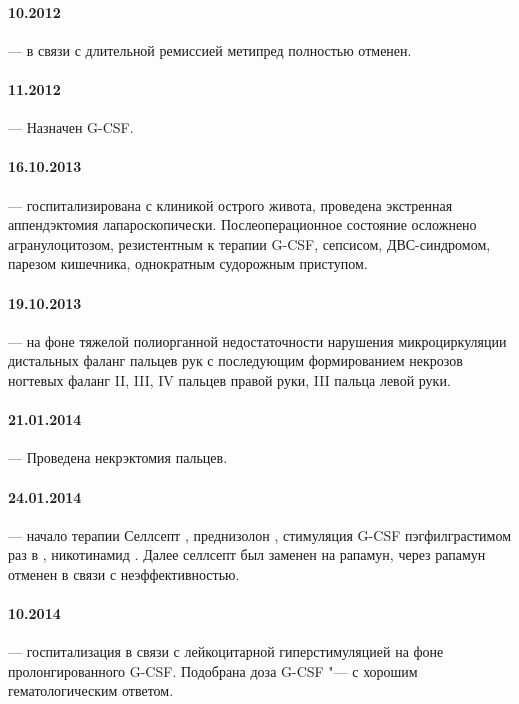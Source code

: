 \documentclass[a4paper,14pt]{extarticle}
\newcommand{\mgpd}{мг/сут.}
\newcommand{\mugpkg}{мкг/кг}
\newcommand{\months}{мес.}
\newcommand{\weeks}{нед.}
\begin{document}
\paragraph{10.2012} --- в связи с длительной ремиссией метипред полностью отменен.

\paragraph{11.2012} --- Назначен G-CSF.

\paragraph{16.10.2013} --- госпитализирована с клиникой острого живота, проведена экстренная аппендэктомия лапароскопически. Послеоперационное состояние осложнено агранулоцитозом, резистентным к терапии G-CSF, сепсисом, ДВС-синдромом, парезом кишечника, однократным судорожным приступом.

\paragraph{19.10.2013} --- на фоне тяжелой полиорганной недостаточности нарушения микроциркуляции дистальных фаланг пальцев рук с последующим формированием некрозов ногтевых фаланг II, III, IV пальцев правой руки, III пальца левой руки.

\paragraph{21.01.2014} --- Проведена некрэктомия пальцев.

\paragraph{24.01.2014} --- начало терапии Селлсепт \numprint[\mgpd]{1000}, преднизолон \numprint[\mgpd]{7.5}, стимуляция G-CSF пэгфилграстимом  раз в \numprint[\weeks]{2}, никотинамид \numprint[\mgpd]{400}. Далее селлсепт был заменен на рапамун, через \numprint[\months]{3} рапамун отменен в связи с неэффективностью.

\paragraph{10.2014} --- госпитализация в связи с лейкоцитарной гиперстимуляцией на фоне пролонгированного G-CSF. Подобрана доза G-CSF "--- \numprint[\mugpkg]{1} с хорошим гематологическим ответом.
\end{document}
